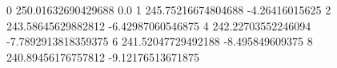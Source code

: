 0 250.01632690429688 0.0
1 245.75216674804688 -4.26416015625
2 243.58645629882812 -6.42987060546875
4 242.22703552246094 -7.7892913818359375
6 241.52047729492188 -8.495849609375
8 240.89456176757812 -9.12176513671875
